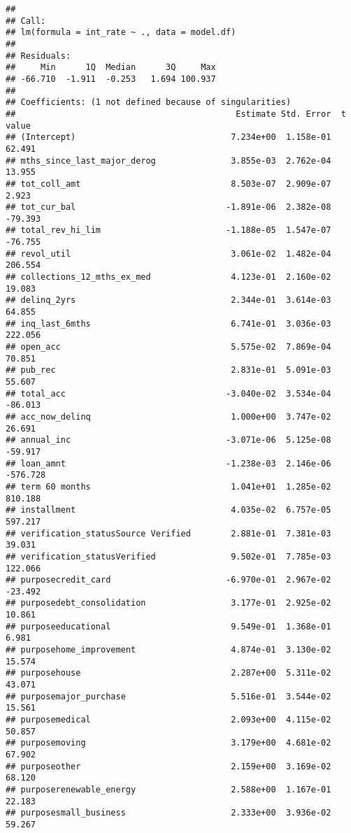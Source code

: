 \documentclass[]{article}
\begin{document}
\begin{verbatim}
## 
## Call:
## lm(formula = int_rate ~ ., data = model.df)
## 
## Residuals:
##     Min      1Q  Median      3Q     Max 
## -66.710  -1.911  -0.253   1.694 100.937 
## 
## Coefficients: (1 not defined because of singularities)
##                                            Estimate Std. Error  t value
## (Intercept)                               7.234e+00  1.158e-01   62.491
## mths_since_last_major_derog               3.855e-03  2.762e-04   13.955
## tot_coll_amt                              8.503e-07  2.909e-07    2.923
## tot_cur_bal                              -1.891e-06  2.382e-08  -79.393
## total_rev_hi_lim                         -1.188e-05  1.547e-07  -76.755
## revol_util                                3.061e-02  1.482e-04  206.554
## collections_12_mths_ex_med                4.123e-01  2.160e-02   19.083
## delinq_2yrs                               2.344e-01  3.614e-03   64.855
## inq_last_6mths                            6.741e-01  3.036e-03  222.056
## open_acc                                  5.575e-02  7.869e-04   70.851
## pub_rec                                   2.831e-01  5.091e-03   55.607
## total_acc                                -3.040e-02  3.534e-04  -86.013
## acc_now_delinq                            1.000e+00  3.747e-02   26.691
## annual_inc                               -3.071e-06  5.125e-08  -59.917
## loan_amnt                                -1.238e-03  2.146e-06 -576.728
## term 60 months                            1.041e+01  1.285e-02  810.188
## installment                               4.035e-02  6.757e-05  597.217
## verification_statusSource Verified        2.881e-01  7.381e-03   39.031
## verification_statusVerified               9.502e-01  7.785e-03  122.066
## purposecredit_card                       -6.970e-01  2.967e-02  -23.492
## purposedebt_consolidation                 3.177e-01  2.925e-02   10.861
## purposeeducational                        9.549e-01  1.368e-01    6.981
## purposehome_improvement                   4.874e-01  3.130e-02   15.574
## purposehouse                              2.287e+00  5.311e-02   43.071
## purposemajor_purchase                     5.516e-01  3.544e-02   15.561
## purposemedical                            2.093e+00  4.115e-02   50.857
## purposemoving                             3.179e+00  4.681e-02   67.902
## purposeother                              2.159e+00  3.169e-02   68.120
## purposerenewable_energy                   2.588e+00  1.167e-01   22.183
## purposesmall_business                     2.333e+00  3.936e-02   59.267

\end{verbatim}
\end{document}
